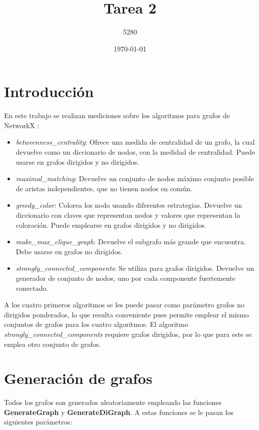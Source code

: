 \documentclass{article}
\title{
Tarea 2
}
\author{5280}
\date{\today}
\begin{document}
\maketitle


\section*{Introducción}

En este trabajo se realizan mediciones sobre los algoritmos para grafos de NetworkX \citep{networkx}:

\begin{itemize}
\item \textit{betweenness\_centrality}: Ofrece una medida de centralidad de un grafo, la cual devuelve como un diccionario de nodos, con la medidad de centralidad. Puede usarse en grafos dirigidos y no dirigidos.

\item \textit{maximal\_matching}: Devuelve un conjunto de nodos máximo conjunto posible de aristas independientes, que no tienen nodos en común. 

\item \textit{greedy\_color}: Colorea los nodo usando diferentes estrategias. Devuelve un diccionario con claves que representan nodos y valores que representan la coloración. Puede emplearse en grafos dirigidos y no dirigidos.

\item \textit{make\_max\_clique\_graph}: Devuelve el subgrafo más grande que encuentra. Debe usarse en grafos no dirigidos.
\item \textit{strongly\_connected\_components}: Se utiliza para grafos dirigidos. Devuelve un generador de conjunto de nodos, uno por cada componente fuertemente conectado. 
\end{itemize}

A los cuatro primeros algoritmos se les puede pasar como parámetro grafos no dirigidos ponderados, lo que resulta conveniente pues permite emplear el mismo conjuntos de grafos para los cuatro algoritmos. El algoritmo \textit{strongly\_connected\_components} requiere grafos dirigidos, por lo que para este se emplea otro conjunto de grafos.


\section*{Generación de grafos}
Todos los grafos son generados aleatoriamente empleando las funciones \textbf{GenerateGraph} y \textbf{GenerateDiGraph}. A estas funciones se le pasan los siguientes parámetros: 
\end{document}
